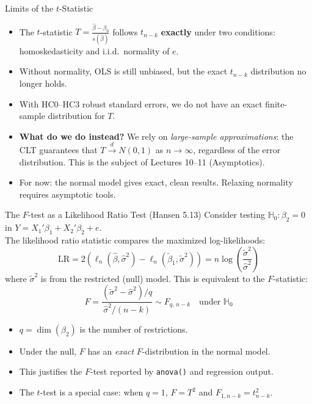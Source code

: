 \documentclass[aspectratio=169, handout, t]{beamer}
\numberwithin{equation}{section}
\begin{document}
\begin{frame}{Limits of the $t$-Statistic}
\begin{itemize}
\item The $t$-statistic $T=\frac{\hat{\beta}-\beta_0}{s(\hat{\beta})}$ follows $t_{n-k}$ \textbf{exactly} under two conditions: homoskedasticity and i.i.d.\ normality of $e$.\pause
\item Without normality, OLS is still unbiased, but the exact $t_{n-k}$ distribution no longer holds.\pause
\item With HC0--HC3 robust standard errors, we do not have an exact finite-sample distribution for $T$.\pause
\item \textbf{What do we do instead?} We rely on \emph{large-sample approximations}: the CLT guarantees that $T\overset{d}{\to} N(0,1)$ as $n\to\infty$, regardless of the error distribution. This is the subject of Lectures 10--11 (Asymptotics).\pause
\item For now: the normal model gives exact, clean results. Relaxing normality requires asymptotic tools.
\end{itemize}
\end{frame}

\begin{frame}{The $F$-test as a Likelihood Ratio Test (Hansen 5.13)}
Consider testing $\mathbb{H}_0: \beta_2=0$ in $Y=X_1'\beta_1+X_2'\beta_2+e$.\\
The likelihood ratio statistic compares the maximized log-likelihoods:
$$\text{LR}=2\left(\ell_n(\hat{\beta},\hat{\sigma}^2)-\ell_n(\tilde{\beta}_1,\tilde{\sigma}^2)\right)=n\log\!\left(\frac{\tilde{\sigma}^2}{\hat{\sigma}^2}\right)$$\pause
where $\tilde{\sigma}^2$ is from the restricted (null) model.  This is equivalent to the $F$-statistic:
$$F=\frac{(\tilde{\sigma}^2-\hat{\sigma}^2)/q}{\hat{\sigma}^2/(n-k)}\sim F_{q,\, n-k}\quad\text{under }\mathbb{H}_0$$\pause
\begin{itemize}
\item $q=\dim(\beta_2)$ is the number of restrictions.
\item Under the null, $F$ has an \emph{exact} $F$-distribution in the normal model.
\item This justifies the $F$-test reported by \texttt{anova()} and regression output.\pause
\item The $t$-test is a special case: when $q=1$, $F=T^2$ and $F_{1,n-k}=t_{n-k}^2$.
\end{itemize}
\end{frame}
\end{document}

